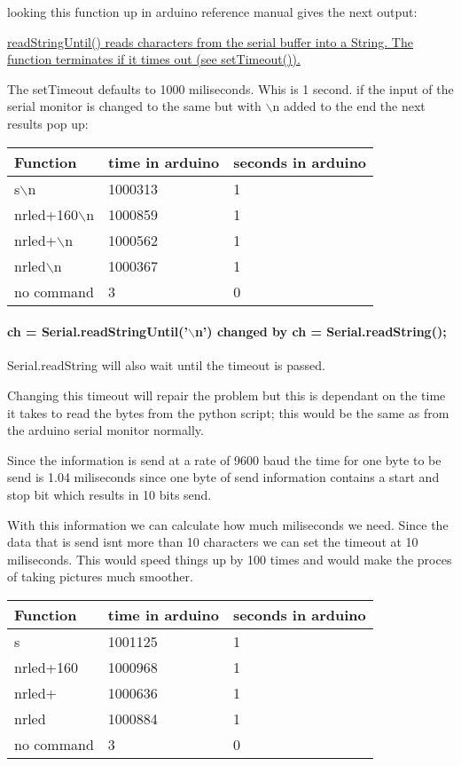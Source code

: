 \documentclass{scrartcl}
\begin{document}
looking this function up in arduino reference manual gives the next output:

\uline{readStringUntil() reads characters from the serial buffer into a String. The function terminates if it times out (see setTimeout()).}



The setTimeout defaults to 1000 miliseconds. Whis is 1 second. if the input of the serial monitor is changed to the same but with $\backslash$n added to the end the next results pop up:

\begin{tabular}{ |l|l|l| }
\hline
 Function & time in arduino & seconds in arduino \tabularnewline
\hline
\hline
 s$\backslash$n & 1000313 & 1 \tabularnewline
\hline
 nrled+160$\backslash$n & 1000859 & 1 \tabularnewline
\hline
 nrled+$\backslash$n & 1000562 & 1 \tabularnewline
\hline
 nrled$\backslash$n & 1000367 & 1 \tabularnewline
\hline
 no command & 3 & 0 \tabularnewline
\hline
\end{tabular}




\paragraph{ch = Serial.readStringUntil('$\backslash$n') changed by  ch = Serial.readString();}

Serial.readString will also wait until the timeout is passed. 

Changing this timeout will repair the problem but this is dependant on the time it takes to read the bytes from the python script; this would be the same as from the arduino serial monitor normally.

Since the information is send at a rate of 9600 baud the time for one byte to be send is 1.04 miliseconds since one byte of send information contains a start and stop bit which results in 10 bits send.

With this information we can calculate how much miliseconds we need. Since the data that is send isnt more than 10 characters we can set the timeout at 10 miliseconds. This would speed things up by 100 times and would make the proces of taking pictures much smoother.



\begin{tabular}{ |l|l|l| }
\hline
 Function & time in arduino & seconds in arduino \tabularnewline
\hline
\hline
 s & 1001125 & 1 \tabularnewline
\hline
 nrled+160 & 1000968 & 1 \tabularnewline
\hline
 nrled+ & 1000636 & 1 \tabularnewline
\hline
 nrled & 1000884 & 1 \tabularnewline
\hline
 no command & 3 & 0 \tabularnewline
\hline
\end{tabular}
\end{document}
